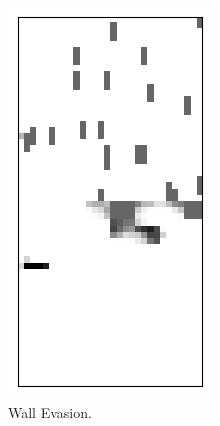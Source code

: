 \begin{figure}[t!]
\begin{subfigure}{0.3\columnwidth}
		\centering
		\includegraphics[width=\linewidth]{documentation/report/img/cvae_scroll_walls.png}
		\caption{Wall Evasion.}
		\label{subfig:cvae_scroll_walls}
	\end{subfigure}
	~ 
	\begin{subfigure}{0.3\columnwidth}
		\centering

\end{subfigure}
\end{figure}
